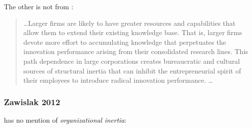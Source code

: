The other is not from \cite{zhou2010technological}:\\
\begin{quotation}
\ldots Larger firms are likely to have greater resources and capabilities that allow them
to extend their existing knowledge base. That is, larger firms devote more effort to
accumulating knowledge that perpetuates the innovation performance arising from their
consolidated research lines. This path dependence in large corporations creates bureaucratic
and cultural sources of structural inertia that can inhibit the entrepreneurial spirit of their
employees to introduce radical innovation performance. \ldots
\end{quotation}

\subsubsection{Zawislak 2012}

\cite{zawislak2012innovation} has no mention of \textit{organizational inertia}:

